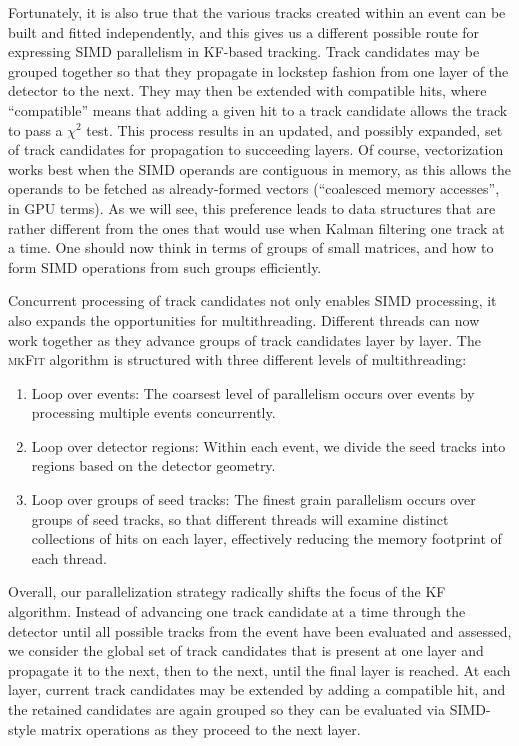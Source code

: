 \documentclass[a4paper,11pt]{article}
\newcommand{\mkFit}{\textsc{mkFit}\xspace}
\begin{document}
Fortunately, it is also true that the various tracks created within an event can be built and fitted independently, and this gives us a different possible route for expressing SIMD parallelism in KF-based tracking. Track candidates may be grouped together so that they
propagate in lockstep fashion from one layer of the detector to the next. They may then be extended with compatible hits, where ``compatible'' means that adding a given hit to a track candidate allows the track to pass a $\chi^2$ test. This process results in an updated, and possibly expanded, set of track candidates for propagation to succeeding layers. Of course, vectorization works best when the SIMD operands are contiguous in memory, as this allows the operands to be fetched as already-formed vectors (``coalesced memory accesses'', in GPU terms). As we will see, this preference leads to data structures that are rather different from the ones that would use when Kalman filtering one track at a time. One should now think in terms of groups of small matrices, and how to form SIMD operations from such groups efficiently.

Concurrent processing of track candidates not only enables SIMD processing, it also expands the opportunities for multithreading.  Different threads can now work together %
as they advance groups of track candidates layer by layer. The \mkFit algorithm is structured with three different levels of multithreading: 
\begin{enumerate}
    \item Loop over events: The coarsest level of parallelism occurs over events by processing multiple events concurrently.
    \item Loop over detector regions: Within each event, we divide the seed tracks into regions based on the detector geometry.
    \item Loop over groups of seed tracks: The finest grain parallelism occurs over groups of seed tracks, so that different threads will examine distinct collections of hits on each layer, effectively reducing the memory footprint of each thread.
\end{enumerate}

Overall, our parallelization strategy radically shifts the focus of the KF algorithm. Instead of advancing one track candidate at a time through the detector until all possible tracks from the event have been evaluated and assessed, we consider the global set of track candidates that is present at one layer and propagate it to the next, then to the next, until the final layer is reached. At each layer, current track candidates may be extended by adding a compatible hit, and the retained candidates are again grouped so they can be evaluated via SIMD-style matrix operations as they proceed to the next layer.
\end{document}
